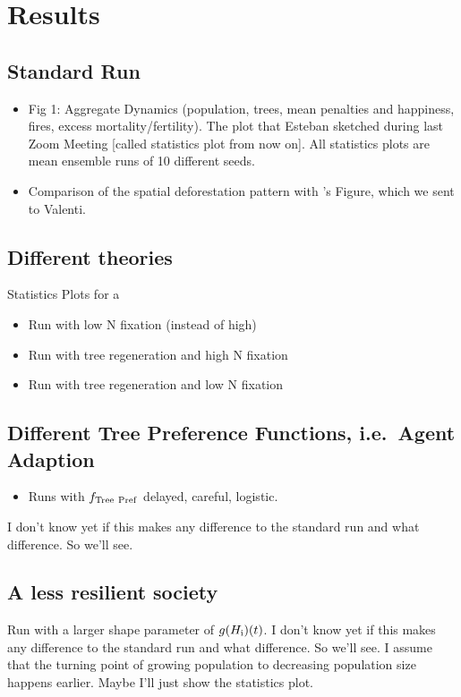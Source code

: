 \chapter{Results}

\section{Standard Run}
 \begin{itemize}
 	\item Fig 1: Aggregate Dynamics (population, trees, mean penalties and happiness, fires, excess mortality/fertility). The plot that Esteban sketched during last Zoom Meeting [called statistics plot from now on]. All statistics plots are mean ensemble runs of 10 different seeds.
 	\item Comparison of the spatial deforestation pattern with \citet{Rull2020}'s Figure, which we sent to Valenti.
 \end{itemize}

\section{Different theories}
Statistics Plots for a
\begin{itemize}
	\item Run with low N fixation (instead of high)
	\item Run with tree regeneration and high N fixation
	\item Run with tree regeneration and low N fixation
\end{itemize}

\section{Different Tree Preference Functions, i.e.\ Agent Adaption}
\begin{itemize}
	\item Runs with $f_{\rm Tree \ Pref}$ delayed, careful, logistic.
\end{itemize}
I don't know yet if this makes any difference to the standard run and what difference. So we'll see.

\section{A less resilient society}
Run with a larger shape parameter of $g(H_{\rm i})(t)$.
I don't know yet if this makes any difference to the standard run and what difference. So we'll see.
I assume that the turning point of growing population to decreasing population size happens earlier. Maybe I'll just show the statistics plot.


